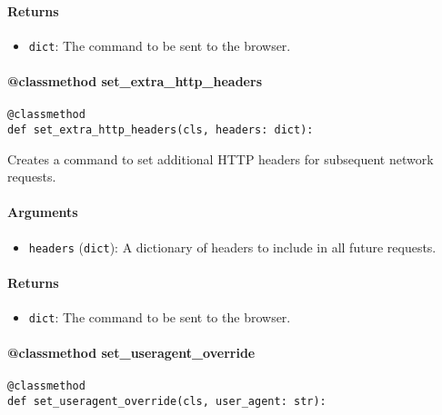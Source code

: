 \documentclass{article}
\begin{document}
\paragraph{Returns}

\begin{itemize}
    \item \lstinline[style=pythonstyle]|dict|: The command to be sent to the browser.
\end{itemize}

\paragraph{@classmethod set\_extra\_http\_headers}

\begin{lstlisting}[style=pythonstyle]
@classmethod
def set_extra_http_headers(cls, headers: dict):
\end{lstlisting}

\noindent Creates a command to set additional HTTP headers for subsequent network requests.

\paragraph{Arguments}

\begin{itemize}
    \item \lstinline[style=pythonstyle]|headers| (\lstinline[style=pythonstyle]|dict|): A dictionary of headers to include in all future requests.
\end{itemize}

\paragraph{Returns}

\begin{itemize}
    \item \lstinline[style=pythonstyle]|dict|: The command to be sent to the browser.
\end{itemize}

\paragraph{@classmethod set\_useragent\_override}

\begin{lstlisting}[style=pythonstyle]
@classmethod
def set_useragent_override(cls, user_agent: str):
\end{lstlisting}
\end{document}
